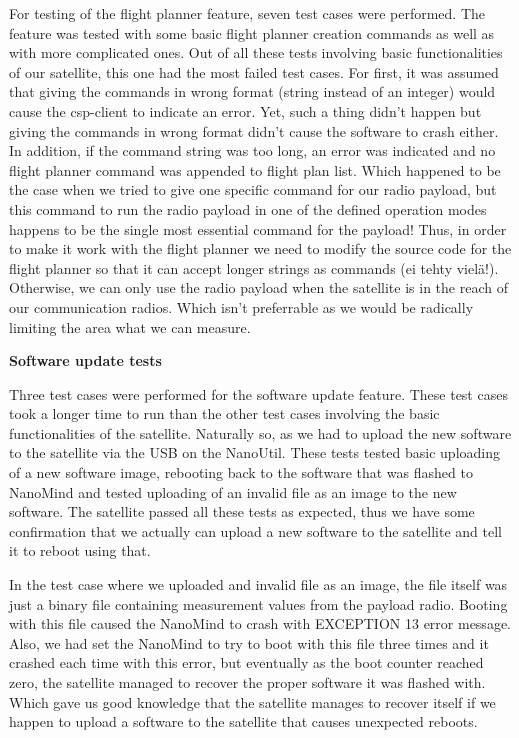 \documentclass[english,12pt,a4paper,pdftex,elec,utf8]{aaltothesis}
\begin{document}
For testing of the flight planner feature, seven test cases were performed. The feature was tested with some basic flight planner creation commands as well as with more complicated ones. Out of all these tests involving basic functionalities of our satellite, this one had the most failed test cases. For first, it was assumed that giving the commands in wrong format (string instead of an integer) would cause the csp-client to indicate an error. Yet, such a thing didn't happen but giving the commands in wrong format didn't cause the software to crash either. In addition, if the command string was too long, an error was indicated and no flight planner command was appended to flight plan list. Which happened to be the case when we tried to give one specific command for our radio payload, but this command to run the radio payload in one of the defined operation modes happens to be the single most essential command for the payload! Thus, in order to make it work with the flight planner we need to modify the source code for the flight planner so that it can accept longer strings as commands (ei tehty vielä!). Otherwise, we can only use the radio payload when the satellite is in the reach of our communication radios. Which isn't preferrable as we would be radically limiting the area what we can measure.\par
\textbf{Software update tests}
\par 
Three test cases were performed for the software update feature. These test cases took a longer time to run than the other test cases involving the basic functionalities of the satellite. Naturally so, as we had to upload the new software to the satellite via the USB on the NanoUtil. These tests tested basic uploading of a new software image, rebooting back to the software that was flashed to NanoMind and tested uploading of an invalid file as an image to the new software. The satellite passed all these tests as expected, thus we have some confirmation that we actually can upload a new software to the satellite and tell it to reboot using that.\par
In the test case where we uploaded and invalid file as an image, the file itself was just a binary file containing measurement values from the payload radio. Booting with this file caused the NanoMind to crash with EXCEPTION 13 error message. Also, we had set the NanoMind to try to boot with this file three times and it crashed each time with this error, but eventually as the boot counter reached zero, the satellite managed to recover the proper software it was flashed with. Which gave us good knowledge that the satellite manages to recover itself if we happen to upload a software to the satellite that causes unexpected reboots.\par     
\end{document}
